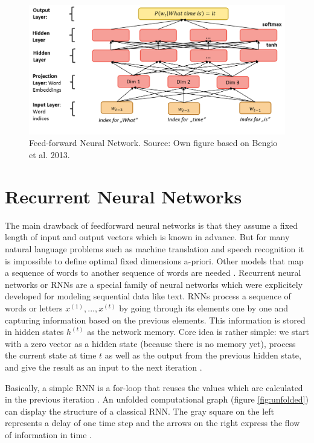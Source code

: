 \documentclass[]{krantz}
\begin{document}
\begin{figure}
\includegraphics[width=1\linewidth]{figures/01-00-deep-learning-for-nlp/01-01_nnlm} \caption{Feed-forward Neural Network. Source: Own figure based on Bengio et al. 2013.}\label{fig:nnlm}
\end{figure}

\hypertarget{recurrent-neural-networks}{%
\section{Recurrent Neural Networks}\label{recurrent-neural-networks}}

The main drawback of feedforward neural networks is that they assume a fixed length of input and output vectors which is known in advance. But for many natural language problems such as machine translation and speech recognition it is impossible to define optimal fixed dimensions a-priori. Other models that map a sequence of words to another sequence of words are needed \citep{sutskever2014sequence}. Recurrent neural networks or RNNs are a special family of neural networks which were explicitely developed for modeling sequential data like text. RNNs process a sequence of words or letters \(x^{(1)}, ..., x^{(t)}\) by going through its elements one by one and capturing information based on the previous elements. This information is stored in hidden states \(h^{(t)}\) as the network memory. Core idea is rather simple: we start with a zero vector as a hidden state (because there is no memory yet), process the current state at time \(t\) as well as the output from the previous hidden state, and give the result as an input to the next iteration \citep{goodfellow2016deep}.

Basically, a simple RNN is a for-loop that reuses the values which are calculated in the previous iteration \citep{chollet2018deep}. An unfolded computational graph (figure \ref{fig:unfolded}) can display the structure of a classical RNN. The gray square on the left represents a delay of one time step and the arrows on the right express the flow of information in time \citep{goodfellow2016deep}.
\end{document}
